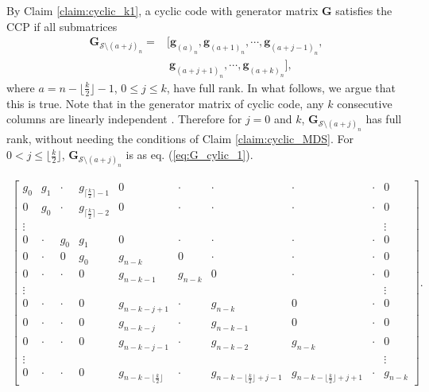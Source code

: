 \documentclass[journal,twocolumn]{IEEEtran}
\theoremstyle{definition}
\newcommand{\calS}{\mathcal{S}}
\newcommand{\bfg}{\mathbf{g}}
\newcommand{\bfG}{\mathbf{G}}
\newcommand{\aditya}[1]{\marginpar{+}{\bf Aditya's remark}: {\em #1}}
\begin{document}
By Claim \ref{claim:cyclic_k1}, a cyclic code with generator matrix $\bfG$ satisfies the CCP if all submatrices \begin{align*}
\bfG_{\calS\setminus (a+j)_n}=&[\bfg_{(a)_n},\bfg_{(a+1)_n},\cdots,\bfg_{(a+j-1)_n},\\
&~\bfg_{(a+j+1)_n},\cdots,\bfg_{(a+k)_n}],
\end{align*} where $a=n-\lfloor \frac{k}{2}\rfloor-1$, $0\le j\le k$, have full rank. %
In what follows, we argue that this is true.
Note that in the generator matrix of cyclic code, any $k$ consecutive columns are linearly independent \cite{lincostello}. Therefore for $j=0$ and $k$, $\bfG_{\calS\setminus (a+j)_n}$ has full rank, without needing the conditions of Claim \ref{claim:cyclic_MDS}.
For $0<j\le \lfloor \frac{k}{2}\rfloor$, $\bfG_{\calS\setminus (a+j)_n}$ is as eq. (\ref{eq:G_cylic_1}).
\begin{table*}
	\begin{align}
	\label{eq:G_cylic_1}
	\begin{bmatrix}
	g_0&g_1&\cdot&g_{\lceil\frac{k}{2}\rceil-1}&0&\cdot&\cdot&\cdot&\cdot&0\\
	0  &g_0&\cdot&g_{\lceil\frac{k}{2}\rceil-2}&0&\cdot&\cdot&\cdot&\cdot&0\\
	\vdots&&&&&&&&&\vdots\\
	0&\cdot&g_0&g_1&0&\cdot&\cdot&\cdot&\cdot&0\\
	0&\cdot&0&g_0&g_{n-k}&0&\cdot&\cdot&\cdot&0\\
	0&\cdot&\cdot&0&g_{n-k-1}&g_{n-k}&0&\cdot&\cdot&0\\
	\vdots&&&&&&&&&\vdots\\
	0&\cdot&\cdot&0&g_{n-k-j+1}&\cdot&g_{n-k}&0&\cdot&0\\
	0&\cdot&\cdot&0&g_{n-k-j}&\cdot&g_{n-k-1}&0&\cdot&0\\
	0&\cdot&\cdot&0&g_{n-k-j-1}&\cdot&g_{n-k-2}&g_{n-k}&\cdot&0\\
	\vdots&&&&&&&&&\vdots\\
	0&\cdot&\cdot&0&g_{n-k-\lfloor \frac{k}{2}\rfloor}&\cdot&g_{n-k-\lfloor \frac{k}{2}\rfloor+j-1}&g_{n-k-\lfloor \frac{k}{2}\rfloor+j+1}&\cdot&g_{n-k}
	\end{bmatrix}.
	\end{align}
\end{table*}
\end{document}
